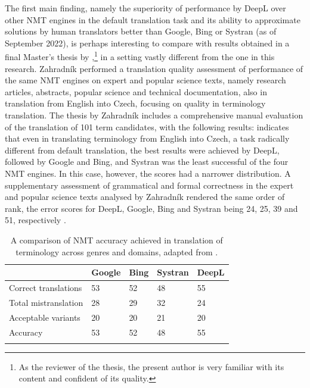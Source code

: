 \documentclass[output=paper]{langscibook}
\begin{document}
The first main finding, namely the superiority of performance by DeepL over other NMT engines in the default translation task and its ability to approximate solutions by human translators better than Google, Bing or Systran (as of  {September 2022}), is perhaps interesting to compare with results obtained in a final Master’s thesis by \citet{Zahradník2022},\footnote{As the reviewer of the thesis, the present author is very familiar with its content and confident of its quality.}  in a setting vastly different from the one in this research. Zahradník performed a translation quality assessment of performance of the same NMT engines on expert and popular science texts, namely research articles, abstracts, popular science and technical documentation, also in translation from English into Czech, focusing on quality in terminology translation. The thesis by Zahradník includes a comprehensive manual evaluation of the translation of 101 term candidates, with the following results:  indicates that even in translating terminology from English into Czech, a task radically different from default translation, the best results were achieved by DeepL, followed by Google and Bing, and Systran was the least successful of the four NMT engines. In this case, however, the scores had a narrower distribution. A supplementary assessment of grammatical and formal correctness in the expert and popular science texts analysed by Zahradník rendered the same order of rank, the error scores for DeepL, Google, Bing and Systran being 24, 25, 39 and 51, respectively \citep[67]{Zahradník2022}.

\begin{table}
\begin{tabularx}{\textwidth}{lYYYY}
\lsptoprule
 & {{{Google}}} & {{{Bing}}} & {{{Systran}}} & {{{DeepL}}}\\
 \midrule
Correct translations     & 53          & 52           & 48             & 55          \\
Total mistranslation    & 28           &    29        &     32         &      24     \\
Acceptable variants     & 20           &    20        &     21         &      20     \\
\midrule
Accuracy                        &  {53}  &     {52}    &  {48}    &    {55}\\
\lspbottomrule
\end{tabularx}
\caption{A comparison of NMT accuracy achieved in translation of terminology across genres and domains, adapted from \citet[58]{Zahradník2022}.}
\label{tab:kamenicka:3}
\end{table}
\end{document}
